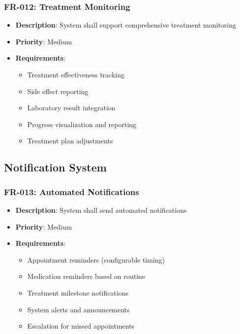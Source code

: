 \documentclass[12pt,a4paper]{article}
\begin{document}
\subsubsection{FR-012: Treatment Monitoring}
\begin{itemize}
    \item \textbf{Description}: System shall support comprehensive treatment monitoring
    \item \textbf{Priority}: Medium
    \item \textbf{Requirements}:
    \begin{itemize}
        \item Treatment effectiveness tracking
        \item Side effect reporting
        \item Laboratory result integration
        \item Progress visualization and reporting
        \item Treatment plan adjustments
    \end{itemize}
\end{itemize}

\subsection{Notification System}

\subsubsection{FR-013: Automated Notifications}
\begin{itemize}
    \item \textbf{Description}: System shall send automated notifications
    \item \textbf{Priority}: Medium
    \item \textbf{Requirements}:
    \begin{itemize}
        \item Appointment reminders (configurable timing)
        \item Medication reminders based on routine
        \item Treatment milestone notifications
        \item System alerts and announcements
        \item Escalation for missed appointments
    \end{itemize}
\end{itemize}
\end{document}
